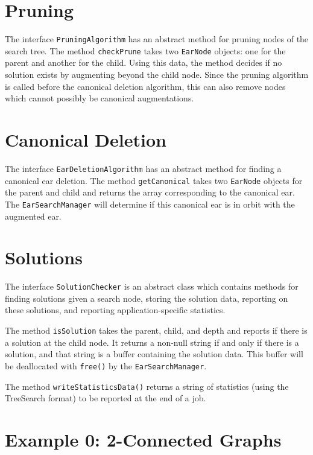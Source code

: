 \documentclass[11pt]{article}
\begin{document}
\section{Pruning}

The interface \texttt{PruningAlgorithm} has an abstract method for
	pruning nodes of the search tree.
The method \texttt{checkPrune} takes two \texttt{EarNode} objects:
	one for the parent and another for the child.
Using this data, the method decides if no solution exists by augmenting
	beyond the child node.
Since the pruning algorithm is called before the canonical deletion algorithm,
	this can also remove nodes which cannot possibly be canonical augmentations.

\section{Canonical Deletion}

The interface \texttt{EarDeletionAlgorithm} has 
	an abstract method for finding a canonical ear deletion.
The method \texttt{getCanonical} takes two \texttt{EarNode} 
	objects for the parent and child
	and returns the array corresponding to the canonical ear.
The \texttt{EarSearchManager} will determine if this
	canonical ear is in orbit with the augmented ear.

\section{Solutions}

The interface \texttt{SolutionChecker} is an abstract class
	which contains methods for finding solutions given
	a search node, storing the solution data, reporting
	on these solutions, and reporting application-specific
	statistics.
	
The method \texttt{isSolution} takes the parent, child, and depth
	and reports if there is a solution at the child node.
It returns a non-null string if and only if there is a solution,
	and that string is a buffer containing the solution data.
This buffer will be deallocated with \texttt{free()} by 
	the \texttt{EarSearchManager}.

The method \texttt{writeStatisticsData()}
	returns a string of statistics (using the TreeSearch format)
	to be reported at the end of a job.



\section{Example 0: 2-Connected Graphs}
\end{document}
